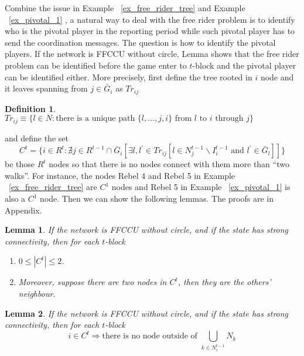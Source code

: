 \documentclass[12pt,letter]{article}
\newtheorem{lemma}{Lemma}[section]
\newtheorem{definition}{Definition}[section]
\theoremstyle{definition}
\theoremstyle{remark}
\theoremstyle{claim}
\begin{document}
Combine the issue in Example ~\ref{ex_free_rider_tree} and Example ~\ref{ex_pivotal_1} , a natural way to deal with the free rider problem is to identify who is the pivotal player in the reporting period while such pivotal player has to send the coordination messages. The question is how to identify the pivotal players. If the network is FFCCU without circle, Lemma shows that the free rider problem can be identified before the game enter to $t$-block and the pivotal player can be identified either. More precisely, first define the tree rooted in $i$ node and it leaves spanning from $j\in \bar{G}_i$ as $Tr_{ij}$

\begin{definition}
$Tr_{ij}\equiv \{l\in N:\text{there is a unique path $\{l,...,j,i\}$ from $l$ to $i$ through $j$}\}$
\end{definition}
and define the set
\[C^t=\{i\in R^t:\nexists j\in R^{t-1}\cap \bar{G}_i[\exists l,l^{'}\in Tr_{ij}[l\in N^{t-1}_j\backslash I^{t-1}_i \text{ and } l^{'}\in \bar{G}_l]]\}\]
be those $R^t$ nodes so that there is no nodes connect with them more than ``two walks''. For instance, the nodes Rebel 4 and Rebel 5 in Example ~\ref{ex_free_rider_tree} are $C^1$ nodes and Rebel 5 in Example ~\ref{ex_pivotal_1} is also a $C^1$ node. Then we can show the following lemmas. The proofs are in Appendix.

\begin{lemma}
\label{lemma_at_most_two_nodes}
If the network is FFCCU without circle, and  if the state has strong connectivity, then for each $t$-block
\begin{enumerate}
\item $0\leq |C^t| \leq 2$.
\item Moreover, suppose there are two nodes in $C^t$, then they are the others' neighbour.
\end{enumerate}
\end{lemma}


\begin{lemma}
\label{lemma_no_node_outside}
If the network is FFCCU without circle, and if the state has strong connectivity, then for each $t$-block
\[i\in C^t \Rightarrow \text{there is no node outside of }\bigcup_{k\in N^{t-1}_i}N_k\]
\end{lemma}
\end{document}
